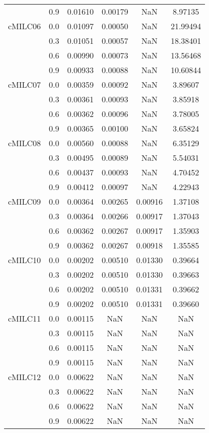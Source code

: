 \begin{longtable}{cccccc}
        & 0.9 & 0.01610 & 0.00179 & NaN & 8.97135 \\
cMILC06 & 0.0 & 0.01097 & 0.00050 & NaN & 21.99494 \\
        & 0.3 & 0.01051 & 0.00057 & NaN & 18.38401 \\
        & 0.6 & 0.00990 & 0.00073 & NaN & 13.56468 \\
        & 0.9 & 0.00933 & 0.00088 & NaN & 10.60844 \\
cMILC07 & 0.0 & 0.00359 & 0.00092 & NaN & 3.89607 \\
        & 0.3 & 0.00361 & 0.00093 & NaN & 3.85918 \\
        & 0.6 & 0.00362 & 0.00096 & NaN & 3.78005 \\
        & 0.9 & 0.00365 & 0.00100 & NaN & 3.65824 \\
cMILC08 & 0.0 & 0.00560 & 0.00088 & NaN & 6.35129 \\
        & 0.3 & 0.00495 & 0.00089 & NaN & 5.54031 \\
        & 0.6 & 0.00437 & 0.00093 & NaN & 4.70452 \\
        & 0.9 & 0.00412 & 0.00097 & NaN & 4.22943 \\
cMILC09 & 0.0 & 0.00364 & 0.00265 & 0.00916 & 1.37108 \\
        & 0.3 & 0.00364 & 0.00266 & 0.00917 & 1.37043 \\
        & 0.6 & 0.00362 & 0.00267 & 0.00917 & 1.35903 \\
        & 0.9 & 0.00362 & 0.00267 & 0.00918 & 1.35585 \\
cMILC10 & 0.0 & 0.00202 & 0.00510 & 0.01330 & 0.39664 \\
        & 0.3 & 0.00202 & 0.00510 & 0.01330 & 0.39663 \\
        & 0.6 & 0.00202 & 0.00510 & 0.01331 & 0.39662 \\
        & 0.9 & 0.00202 & 0.00510 & 0.01331 & 0.39660 \\
cMILC11 & 0.0 & 0.00115 & NaN & NaN & NaN \\
        & 0.3 & 0.00115 & NaN & NaN & NaN \\
        & 0.6 & 0.00115 & NaN & NaN & NaN \\
        & 0.9 & 0.00115 & NaN & NaN & NaN \\
cMILC12 & 0.0 & 0.00622 & NaN & NaN & NaN \\
        & 0.3 & 0.00622 & NaN & NaN & NaN \\
        & 0.6 & 0.00622 & NaN & NaN & NaN \\
        & 0.9 & 0.00622 & NaN & NaN & NaN \\

\end{longtable}
